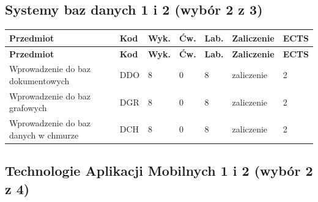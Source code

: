 \documentclass[12pt,a4paper]{article}
\newcommand{\thdrule}{\noalign{\global\setlength{\extrarowheight}{0pt}}}
\newcommand{\thdend}{\noalign{\global\setlength{\extrarowheight}{4pt}}}
\begin{document}
\subsection*{Systemy baz danych 1 i 2 (wybór 2 z 3)}

{\scriptsize
\begin{longtable}{m{5.5cm}m{0.8cm}m{1cm}m{1cm}m{1cm}m{1.7cm}m{0.7cm}}
\thdrule\toprule
\rowcolor{pjatkRed}
{\color{white}\footnotesize\textbf{\vphantom{Ag}Przedmiot}} & {\color{white}\footnotesize\textbf{\vphantom{Ag}Kod}} & {\color{white}\footnotesize\textbf{\vphantom{Ag}Wyk.}} & {\color{white}\footnotesize\textbf{\vphantom{Ag}Ćw.}} & {\color{white}\footnotesize\textbf{\vphantom{Ag}Lab.}} & {\color{white}\footnotesize\textbf{\vphantom{Ag}Zaliczenie}} & {\color{white}\footnotesize\textbf{\vphantom{Ag}ECTS}} \\
\midrule\thdend
\endfirsthead
\thdrule\toprule
\rowcolor{pjatkRed}
{\color{white}\footnotesize\textbf{\vphantom{Ag}Przedmiot}} & {\color{white}\footnotesize\textbf{\vphantom{Ag}Kod}} & {\color{white}\footnotesize\textbf{\vphantom{Ag}Wyk.}} & {\color{white}\footnotesize\textbf{\vphantom{Ag}Ćw.}} & {\color{white}\footnotesize\textbf{\vphantom{Ag}Lab.}} & {\color{white}\footnotesize\textbf{\vphantom{Ag}Zaliczenie}} & {\color{white}\footnotesize\textbf{\vphantom{Ag}ECTS}} \\
\midrule\thdend
\endhead
\rowcolor{tableRowLight} Wprowadzenie do baz dokumentowych & DDO & 8 & 0 & 8 & {\scriptsize zaliczenie} & 2 \\
\rowcolor{tableRowAlt} Wprowadzenie do baz grafowych & DGR & 8 & 0 & 8 & {\scriptsize zaliczenie} & 2 \\
\rowcolor{tableRowLight} Wprowadzenie do baz danych w chmurze & DCH & 8 & 0 & 8 & {\scriptsize zaliczenie} & 2 \\
\bottomrule
\end{longtable}}

\subsection*{Technologie Aplikacji Mobilnych 1 i 2 (wybór 2 z 4)}
\end{document}
